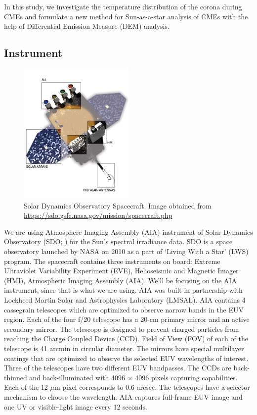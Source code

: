 \message{ !name(main.tex)}\documentclass[12pt]{article}
\begin{document}
In this study, we investigate the temperature distribution of the corona during CMEs and formulate a new method for Sun-as-a-star analysis of CMEs with the help of Differential Emission Measure (DEM) analysis.

\subsection{Instrument}

\begin{figure}[ht]
    \centering
    \includegraphics[width=0.5\textwidth]{images/spacecraft_detailed.jpg}
    \caption[SDO Spacecraft]{Solar Dynamics Observatory Spacecraft.
      Image obtained from {\url{https://sdo.gsfc.nasa.gov/mission/spacecraft.php}}}
    \label{fig:label}
\end{figure}

We are using Atmosphere Imaging Assembly (AIA) instrument of Solar Dynamics Observatory (SDO; \citep{Pesnell2011}) for the Sun's spectral irradiance data. SDO is a space observatory launched by NASA on 2010 as a part of `Living With a Star' (LWS) program. The spacecraft contains three instruments on board: Extreme Ultraviolet Variability Experiment (EVE), Helioseismic and Magnetic Imager (HMI), Atmospheric Imaging Assembly (AIA). We'll be focusing on the AIA instrument, since that is what we are using. AIA was built in partnership with Lockheed Martin Solar and Astrophysics Laboratory (LMSAL). AIA contains 4 cassegrain telescopes which are optimized to observe narrow bands in the EUV region. Each of the four f/20 telescope has a 20-cm primary mirror and an active secondary mirror. The telescope is designed to prevent charged particles from reaching the Charge Coupled Device (CCD). Field of View (FOV) of each of the telescope is 41 arcmin in circular diameter. The mirrors have special multilayer coatings that are optimized to observe the selected EUV wavelengths of interest. Three of the telescopes have two different EUV bandpasses. The CCDs are back-thinned and back-illuminated with 4096 $\times$ 4096 pixels capturing capabilities. Each of the 12 $\mu$m pixel corresponds to 0.6 arcsec. The telescopes have a selector mechanism to choose the wavelength. AIA captures full-frame EUV image and one UV or visible-light image every 12 seconds. \citep{Lemen2011}\\
\end{document}
